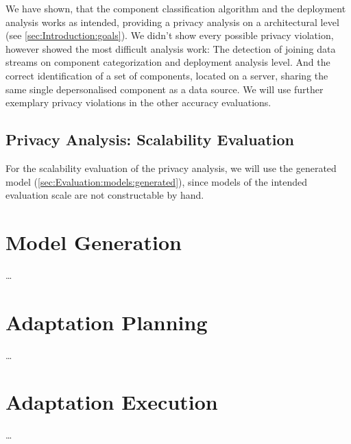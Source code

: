 We have shown, that the component classification algorithm and the deployment analysis works as intended, providing a privacy analysis on a architectural level (see \autoref{sec:Introduction:goals}). We didn't show every possible privacy violation, however showed the most difficult analysis work: The detection of joining data streams on component categorization and deployment analysis level. And the correct identification of a set of components, located on a server, sharing the same single depersonalised component as a data source. We will use further exemplary privacy violations in the other accuracy evaluations.

\subsection{Privacy Analysis: Scalability Evaluation}

For the scalability evaluation of the privacy analysis, we will use the generated model (\autoref{sec:Evaluation:models:generated}), since models of the intended evaluation scale are not constructable by hand. 


\section{Model Generation}
\label{sec:Evaluation:generation}

\dots

\section{Adaptation Planning}
\label{sec:Evaluation:planning}

\dots

\section{Adaptation Execution}
\label{sec:Evaluation:execution}

\dots